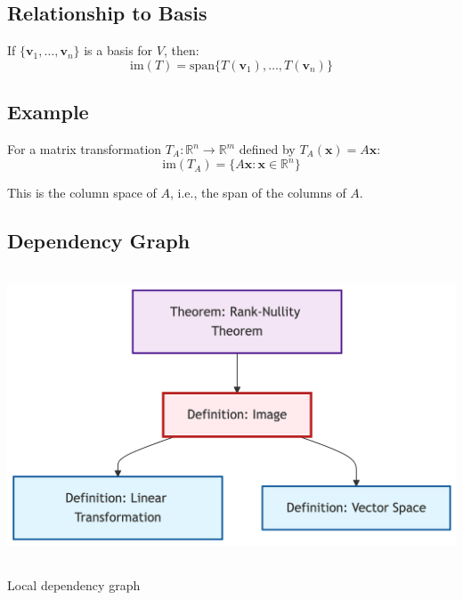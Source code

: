 \documentclass[
  11pt,
  a4paper,
]{article}
\begin{document}
\subsection{Relationship to Basis}\label{relationship-to-basis}

If \(\{\mathbf{v}_1, \ldots, \mathbf{v}_n\}\) is a basis for \(V\),
then:
\[\text{im}(T) = \text{span}\{T(\mathbf{v}_1), \ldots, T(\mathbf{v}_n)\}\]

\subsection{Example}\label{example}

For a matrix transformation \(T_A: \mathbb{R}^n \to \mathbb{R}^m\)
defined by \(T_A(\mathbf{x}) = A\mathbf{x}\):
\[\text{im}(T_A) = \{A\mathbf{x} : \mathbf{x} \in \mathbb{R}^n\}\]

This is the column space of \(A\), i.e., the span of the columns of
\(A\).

\subsection{Dependency Graph}\label{dependency-graph}

\includegraphics[width=5.83in,height=3.4in]{def-image_files/figure-latex/mermaid-figure-1.png}

Local dependency graph
\end{document}

